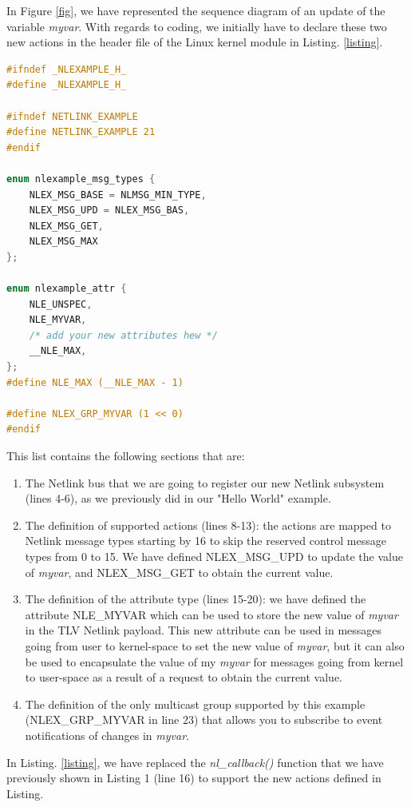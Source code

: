 \documentclass[10pt,onecolumn]{article}
\begin{document}
In Figure \ref{fig}, we have represented the sequence diagram of an update of the variable \textit{myvar}. With regards to coding, we initially have to declare these two new actions in the header file of the Linux kernel module in Listing. \ref{listing}.

\begin{lstlisting}[language=C, caption=Example header file, label=listing2]
#ifndef _NLEXAMPLE_H_
#define _NLEXAMPLE_H_

#ifndef NETLINK_EXAMPLE
#define NETLINK_EXAMPLE 21
#endif

enum nlexample_msg_types {
    NLEX_MSG_BASE = NLMSG_MIN_TYPE,
    NLEX_MSG_UPD = NLEX_MSG_BAS,
    NLEX_MSG_GET,
    NLEX_MSG_MAX
};

enum nlexample_attr {
    NLE_UNSPEC,
    NLE_MYVAR,
    /* add your new attributes hew */
    __NLE_MAX,
};
#define NLE_MAX (__NLE_MAX - 1)

#define NLEX_GRP_MYVAR (1 << 0)
#endif
\end{lstlisting}

This list contains the following sections that are:

\begin{enumerate}
  \item The Netlink bus that we are going to register our new Netlink subsystem (lines 4-6), as we previously did in our "Hello World" example.
  \item The definition of supported actions (lines 8-13): the actions are mapped to Netlink message types starting by 16 to skip the reserved control message types from 0 to 15. We have defined NLEX\_MSG\_UPD to update the value of \textit{myvar}, and NLEX\_MSG\_GET to obtain the current value.
  \item The definition of the attribute type (lines 15-20): we have defined the attribute NLE\_MYVAR which can be used to store the new value of \textit{myvar} in the TLV Netlink payload. This new attribute can be used in messages going from user to kernel-space to set the new value of \textit{myvar}, but it can also be used to encapsulate the value of my \textit{myvar} for messages going from kernel to user-space as a result of a request to obtain the current value.
  \item The definition of the only multicast group supported by this example (NLEX\_GRP\_MYVAR in line 23) that allows you to subscribe to event notifications of changes in \textit{myvar}.
\end{enumerate}

In Listing. \ref{listing}, we have replaced the \textit{nl\_callback()} function that we have previously shown in Listing 1 (line 16) to support the new actions defined in Listing.
\end{document}

